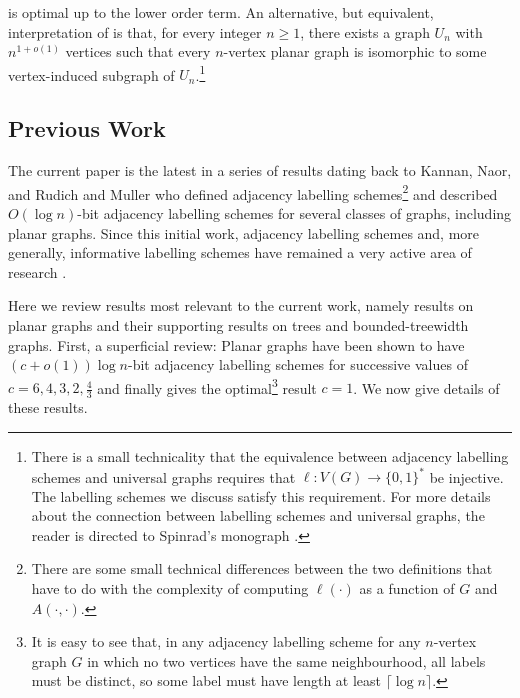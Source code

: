 \documentclass[kpfonts]{patmorin}
\let\ge\geqslant
\begin{document}

 is optimal up to the lower order term.  An alternative, but equivalent, interpretation of  is that, for every integer $n\ge 1$, there exists a graph $U_n$ with $n^{1+o(1)}$  vertices such that every $n$-vertex planar graph is isomorphic to some vertex-induced subgraph of $U_n$.\footnote{There is a small technicality that the equivalence between adjacency labelling schemes and universal graphs requires that $\ell:V(G)\to\{0,1\}^*$ be injective.  The labelling schemes we discuss satisfy this requirement.  For more details about the connection between labelling schemes and universal graphs, the reader is directed to Spinrad's monograph \cite[Section~2.1]{spinrad:efficient}.} 

\subsection{Previous Work}

The current paper is the latest in a series of results dating back to Kannan, Naor, and Rudich \cite{kannan.naor.ea:implicit0,kannan.naor.ea:implicit} and Muller \cite{muller:local} who defined adjacency labelling schemes\footnote{There are some small technical differences between the two definitions that have to do with the complexity of computing $\ell(\cdot)$ as a function of $G$ and
$A(\cdot,\cdot)$.} and described $O(\log n)$-bit adjacency labelling schemes for several classes of graphs, including planar graphs.  Since this initial work, adjacency labelling schemes and, more generally, informative labelling schemes have remained a very active area of research \cite{adjiashvili.rotbart:labeling,alstrup.kaplan.ea:adjacency,abrahamsen.alstrup.ea:near-optimal,alstrup.dahlgaard.ea:sublinear,alstrup.gortz.ea:distance,alstrup.gavoille.ea:simpler,alstrup.rauhe:improved}. 

Here we review results most relevant to the current work, namely results on planar graphs and their supporting results on trees and bounded-treewidth graphs.  First, a superficial review: Planar graphs have been shown to have $(c+o(1))\log n$-bit adjacency labelling schemes for successive values of $c=6,4,3,2,\tfrac{4}{3}$ and finally  gives the optimal\footnote{It is easy to see that, in any adjacency labelling scheme for any $n$-vertex graph $G$ in which no two vertices have the same neighbourhood, all labels must be distinct, so some label must have length at least $\lceil\log n\rceil$.} result $c=1$.  We now give details of these results.
\end{document}
